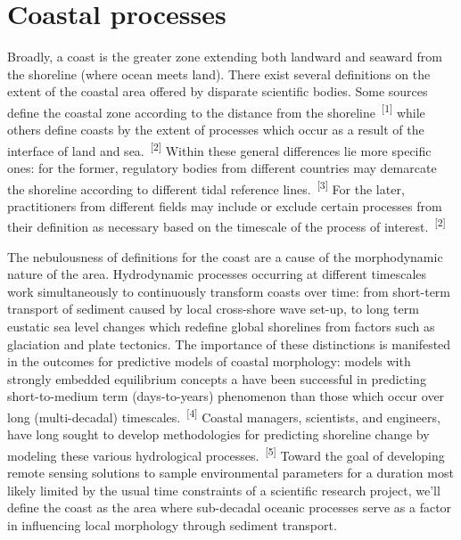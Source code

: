 \documentclass{article}
\begin{document}
\newpage
{}
\fancyfoot[C]{\thepage} 
\thispagestyle{fancy}
\setcounter{page}{1}
\section{Coastal processes}
{\hspace{.5cm} Broadly, a coast is the greater zone extending both landward and seaward from the shoreline (where ocean meets land). There exist several definitions on the extent of the coastal area offered by disparate scientific bodies. Some sources define the coastal zone according to the distance from the shoreline~\textsuperscript{[1]} while others define coasts by the extent of processes which occur as a result of the interface of land and sea.~\textsuperscript{[2]} Within these general differences lie more specific ones: for the former, regulatory bodies from different countries may demarcate the shoreline according to different tidal reference lines.~\textsuperscript{[3]} For the later, practitioners from different fields may include or exclude certain processes from their definition as necessary based on the timescale of the process of interest.~\textsuperscript{[2]} \par}

{The nebulousness of definitions for the coast are a cause of the morphodynamic nature of the area. Hydrodynamic processes occurring at different timescales work simultaneously to continuously transform coasts over time: from short-term transport of sediment caused by local cross-shore wave set-up, to long term eustatic sea level changes which redefine global shorelines from factors such as glaciation and plate tectonics. The importance of these distinctions is manifested in the outcomes for predictive models of coastal morphology: models with strongly embedded equilibrium concepts a have been successful in predicting short-to-medium term (days-to-years) phenomenon than those which occur over long (multi-decadal) timescales.~\textsuperscript{[4]} Coastal managers, scientists, and engineers, have long sought to develop methodologies for predicting shoreline change by modeling these various hydrological processes.~\textsuperscript{[5]} Toward the goal of developing remote sensing solutions to sample environmental parameters for a duration most likely limited by the usual time constraints of a scientific research project, we'll define the coast as the area where sub-decadal oceanic processes serve as a factor in influencing local morphology through sediment transport. \par}
\end{document}
